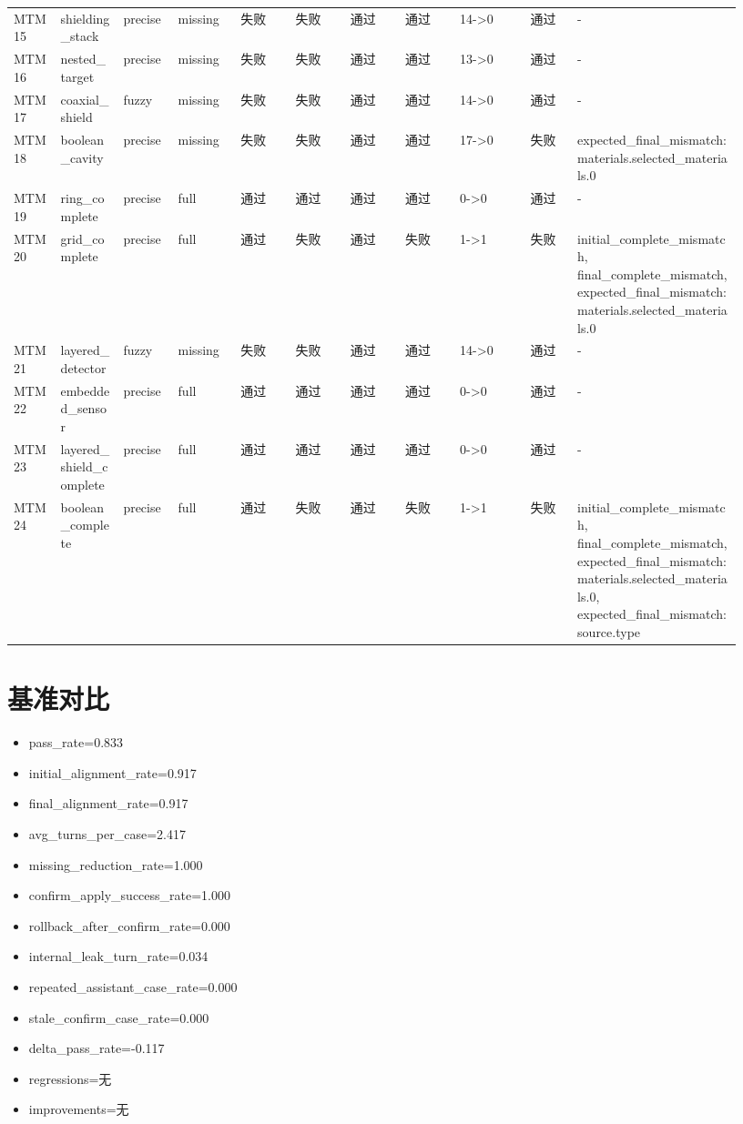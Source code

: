 \documentclass[11pt]{ctexart}
\begin{document}
\begin{longtable}{p{0.06\linewidth}p{0.08\linewidth}p{0.07\linewidth}p{0.08\linewidth}p{0.07\linewidth}p{0.07\linewidth}p{0.07\linewidth}p{0.07\linewidth}p{0.09\linewidth}p{0.06\linewidth}p{0.21\linewidth}}
MTM15 & shielding\_stack & precise & missing & 失败 & 失败 & 通过 & 通过 & 14->0 & 通过 & - \\
MTM16 & nested\_target & precise & missing & 失败 & 失败 & 通过 & 通过 & 13->0 & 通过 & - \\
MTM17 & coaxial\_shield & fuzzy & missing & 失败 & 失败 & 通过 & 通过 & 14->0 & 通过 & - \\
MTM18 & boolean\_cavity & precise & missing & 失败 & 失败 & 通过 & 通过 & 17->0 & 失败 & expected\_final\_mismatch:materials.selected\_materials.0 \\
MTM19 & ring\_complete & precise & full & 通过 & 通过 & 通过 & 通过 & 0->0 & 通过 & - \\
MTM20 & grid\_complete & precise & full & 通过 & 失败 & 通过 & 失败 & 1->1 & 失败 & initial\_complete\_mismatch, final\_complete\_mismatch, expected\_final\_mismatch:materials.selected\_materials.0 \\
MTM21 & layered\_detector & fuzzy & missing & 失败 & 失败 & 通过 & 通过 & 14->0 & 通过 & - \\
MTM22 & embedded\_sensor & precise & full & 通过 & 通过 & 通过 & 通过 & 0->0 & 通过 & - \\
MTM23 & layered\_shield\_complete & precise & full & 通过 & 通过 & 通过 & 通过 & 0->0 & 通过 & - \\
MTM24 & boolean\_complete & precise & full & 通过 & 失败 & 通过 & 失败 & 1->1 & 失败 & initial\_complete\_mismatch, final\_complete\_mismatch, expected\_final\_mismatch:materials.selected\_materials.0, expected\_final\_mismatch:source.type \\
\bottomrule
\end{longtable}
\section{基准对比}
\begin{itemize}
\item pass\_rate=0.833
\item initial\_alignment\_rate=0.917
\item final\_alignment\_rate=0.917
\item avg\_turns\_per\_case=2.417
\item missing\_reduction\_rate=1.000
\item confirm\_apply\_success\_rate=1.000
\item rollback\_after\_confirm\_rate=0.000
\item internal\_leak\_turn\_rate=0.034
\item repeated\_assistant\_case\_rate=0.000
\item stale\_confirm\_case\_rate=0.000
\item delta\_pass\_rate=-0.117
\item regressions=无
\item improvements=无
\end{itemize}
\appendix
\end{document}
